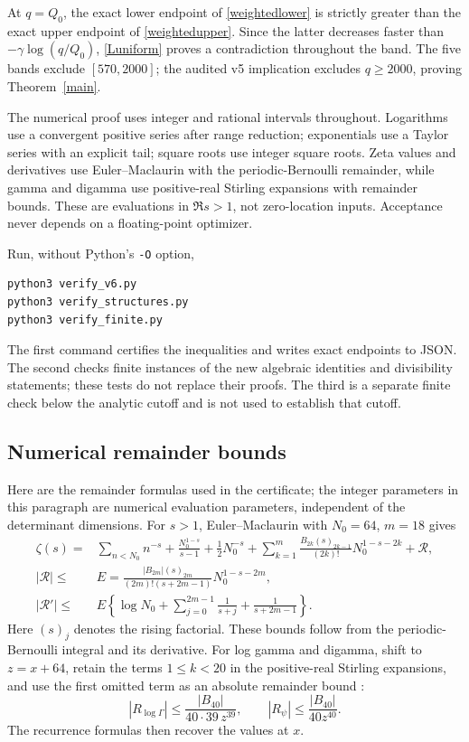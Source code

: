 \documentclass[11pt]{article}
\begin{document}

At \(q=Q_0\), the exact lower endpoint of
\eqref{weightedlower} is strictly greater than the exact upper
endpoint of \eqref{weightedupper}. Since the latter decreases faster
than \(-\gamma\log(q/Q_0)\), \eqref{Luniform} proves a contradiction
throughout the band. The five bands exclude \([570,2000]\); the
audited v5 implication excludes \(q\ge2000\), proving
Theorem~\ref{main}.

The numerical proof uses integer and rational intervals throughout.
Logarithms use a convergent positive series after range reduction;
exponentials use a Taylor series with an explicit tail; square roots
use integer square roots. Zeta values and derivatives use
Euler--Maclaurin with the periodic-Bernoulli remainder, while gamma
and digamma use positive-real Stirling expansions with remainder
bounds. These are evaluations in \(\Re s>1\), not zero-location
inputs. Acceptance never depends on a floating-point optimizer.

Run, without Python's \texttt{-O} option,
\begin{verbatim}
python3 verify_v6.py
python3 verify_structures.py
python3 verify_finite.py
\end{verbatim}
The first command certifies the inequalities and writes exact
endpoints to JSON. The second checks finite instances of the new
algebraic identities and divisibility statements; these tests do not
replace their proofs. The third is a separate finite check below the
analytic cutoff and is not used to establish that cutoff.

\subsection{Numerical remainder bounds}
Here are the remainder formulas used in the certificate; the integer
parameters in this paragraph are numerical evaluation parameters,
independent of the determinant dimensions.
For \(s>1\), Euler--Maclaurin with \(N_0=64\), \(m=18\) gives
\begin{align*}
 \zeta(s)={}&\sum_{n<N_0}n^{-s}+\frac{N_0^{1-s}}{s-1}
      +\frac12N_0^{-s}
      +\sum_{k=1}^{m}\frac{B_{2k}(s)_{2k-1}}{(2k)!}
                      N_0^{1-s-2k}+\mathcal R,\\
 |\mathcal R|\le{}&E=
 \frac{|B_{2m}|(s)_{2m}}{(2m)!(s+2m-1)}N_0^{1-s-2m},\\
 |\mathcal R'|\le{}&E\left\{\log N_0+
       \sum_{j=0}^{2m-1}\frac1{s+j}+\frac1{s+2m-1}\right\}.
\end{align*}
Here \((s)_j\) denotes the rising factorial. These bounds follow
from the periodic-Bernoulli integral and its derivative.
For log gamma and digamma, shift to \(z=x+64\), retain the terms
\(1\le k<20\) in the positive-real Stirling expansions, and use
the first omitted term as an absolute remainder bound
\cite{dlmf}:
\[
 |R_{\log\Gamma}|\le\frac{|B_{40}|}{40\cdot39\,z^{39}},
 \qquad |R_\psi|\le\frac{|B_{40}|}{40z^{40}}.
\]
The recurrence formulas then recover the values at \(x\).
\end{document}
